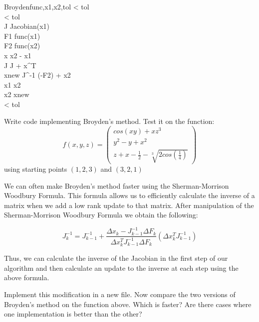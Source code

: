 \begin{pseudo}{Broyden}{func,x1,x2,tol}
\label{Alg:Broyden}
\IF {} < tol \THEN
    \\
\IF {} < tol \THEN
    \\

J \GETS Jacobian(x1) \\

\REPEAT 
F1 \GETS func(x1) \\
F2 \GETS func(x2) \\
\Delta x \GETS x2 - x1 \\
J \GETS J + \Delta x^T \\
xnew \GETS J^{-1} (-F2) + x2 \\
x1 \GETS x2 \\
x2 \GETS xnew \\
\UNTIL {} < tol \THEN {}
\end{pseudo}

\begin{problem}
Write code implementing Broyden's method. Test it on the function:
\[
f(x,y,z) = 
 \left( \begin{array}{ccc}
cos(xy)+ xz^3 \\
y^2 - y + x^2 \\
z + x-\frac{1}{2}-\sqrt[3]{2cos(\frac{1}{4})} \end{array} \right)
\]
using starting points $(1,2,3)$ and $(3,2,1)$
\end{problem}

We can often make Broyden's method faster using the Sherman-Morrison Woodbury Formula. This formula allows us to efficiently calculate the inverse of a matrix when we add a low rank update to that matrix. After manipulation of the Sherman-Morrison Woodbury Formula we obtain the following:

\[
J_k^{-1} = J_{k-1}^{-1} + \frac{\Delta x_k - J_{k-1}^{-1}\Delta F_k}{\Delta x_k^T J_{k-1}^{-1}\Delta F_k} (\Delta x_k^T J_{k-1}^{-1})
\]

Thus, we can calculate the inverse of the Jacobian in the first step of our algorithm and then calculate an update to the inverse at each step using the above formula.

\begin{problem}
Implement this modification in a new file. Now compare the two versions of Broyden's method on the function above. Which is faster? Are there cases where one implementation is better than the other?
\end{problem}
